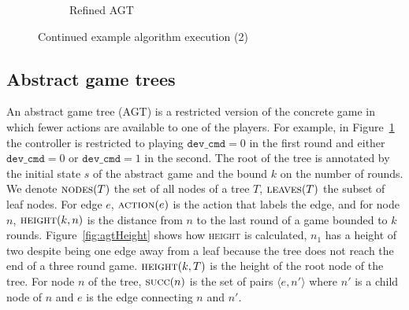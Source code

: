 \begin{figure}
\begin{subfigure}[t]{0.3\textwidth}
\begin{minipage}[t][3.9cm][t]{\textwidth}
        \end{minipage}
        \caption{Refined AGT}
        \label{fig:example1i}
    \end{subfigure}%
    \caption{Continued example algorithm execution (2)}
    \label{fig:example1execont2}
\end{figure}


\subsection{Abstract game trees}

An abstract game tree (AGT) is a restricted version of the concrete game in which fewer actions are available to one of the players. For example, in Figure~\ref{fig:example1i} the controller is restricted to playing $\texttt{dev\_cmd} = 0$ in the first round and either $\texttt{dev\_cmd} = 0$ or $\texttt{dev\_cmd} = 1$ in the second.  The root of the tree is annotated by the initial state $s$ of the abstract game and the bound $k$ on the number of rounds.  We denote $\textsc{nodes}(T)$ the set of all nodes of a tree $T$, $\textsc{leaves}(T)$ the subset of leaf nodes.  For edge $e$, $\textsc{action}(e)$ is the action that labels the edge, and for node $n$, $\textsc{height}(k, n)$ is the distance from $n$ to the last round of a game bounded to $k$ rounds. Figure~\ref{fig:agtHeight} shows how \textsc{height} is calculated, $n_1$ has a height of two despite being one edge away from a leaf because the tree does not reach the end of a three round game.  $\textsc{height}(k, T)$ is the height of the root node of the tree.  For node $n$ of the tree, $\textsc{succ}(n)$ is the set of pairs $\langle e, n' \rangle$ where $n'$ is a child node of $n$ and $e$ is the edge connecting $n$ and $n'$.

